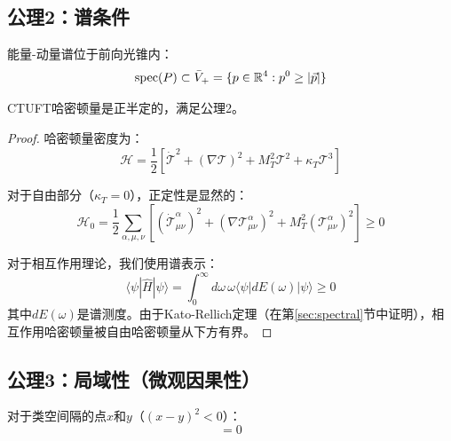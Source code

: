 \subsection{公理2：谱条件}

\begin{axiom}[谱条件]
能量-动量谱位于前向光锥内：
\begin{equation}
    \mathrm{spec}(P) \subset \bar{V}_+ = \{p \in \mathbb{R}^4 : p^0 \geq |\vec{p}|\}
\end{equation}
\end{axiom}

\begin{theorem}[能量正定性]
CTUFT哈密顿量是正半定的，满足公理2。
\end{theorem}

\begin{proof}
哈密顿量密度为：
\begin{equation}
    \mathcal{H} = \frac{1}{2}\left[ \dot{\mathcal{T}}^2 + (\nabla \mathcal{T})^2 + M_T^2 \mathcal{T}^2 + \kappa_T \mathcal{T}^3 \right]
\end{equation}

对于自由部分（$\kappa_T = 0$），正定性是显然的：
\begin{equation}
    \mathcal{H}_0 = \frac{1}{2}\sum_{\alpha,\mu,\nu} \left[ (\dot{\mathcal{T}}^\alpha_{\mu\nu})^2 + (\nabla \mathcal{T}^\alpha_{\mu\nu})^2 + M_T^2 (\mathcal{T}^\alpha_{\mu\nu})^2 \right] \geq 0
\end{equation}

对于相互作用理论，我们使用谱表示：
\begin{equation}
    \langle \psi | \hat{H} | \psi \rangle = \int_0^\infty d\omega \, \omega \langle \psi | dE(\omega) | \psi \rangle \geq 0
\end{equation}
其中$dE(\omega)$是谱测度。由于Kato-Rellich定理（在第\ref{sec:spectral}节中证明），相互作用哈密顿量被自由哈密顿量从下方有界。
\end{proof}

\subsection{公理3：局域性（微观因果性）}

\begin{axiom}[局域性]
对于类空间隔的点$x$和$y$（$(x-y)^2 < 0$）：
\begin{equation}
    [\mathcal{T}^\alpha_{\mu\nu}(x), \mathcal{T}^\beta_{\rho\sigma}(y)] = 0
\end{equation}
\end{axiom}

